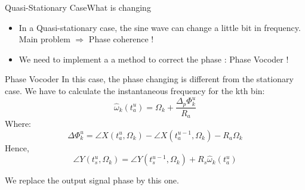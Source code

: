\documentclass{bredelebeamer}
\begin{document}
\begin{frame}{Quasi-Stationary Case}{What is changing}
\begin{itemize}
\item In a Quasi-stationary case, the sine wave can change a little bit in frequency. \\
 Main problem $\Rightarrow$ Phase coherence !
\item We need to implement a a method to correct the phase : Phase Vocoder !
\end{itemize}

\begin{block}{Phase Vocoder}
In this case, the phase changing is different from the stationary case.
We have to calculate the instantaneous frequency for the kth bin:
\begin{equation}
\hat{\omega}_{k} (t_{a}^{u})= \Omega_{k} + \frac {\Delta_{p} \Phi_{k}^{u}} {R_{a}}
\end{equation}
\centering
Where:
\begin{equation}
\Delta\Phi_{k}^{u} = \angle X(t_{a}^{u}, \Omega_{k}) - \angle X(t_{a}^{u-1}, \Omega_{k}) - R_{a}\Omega_{k}
\end{equation}
\centering
Hence,
\begin{equation}
\angle Y(t_{s}^{u}, \Omega_{k}) = \angle Y(t_{s}^{u-1}, \Omega_{k}) + R_{s}\hat{\omega}_{k}(t_{a}^{u})
\end{equation}

We replace the output signal phase by this one.
\end{block}

\end{frame}
\end{document}
